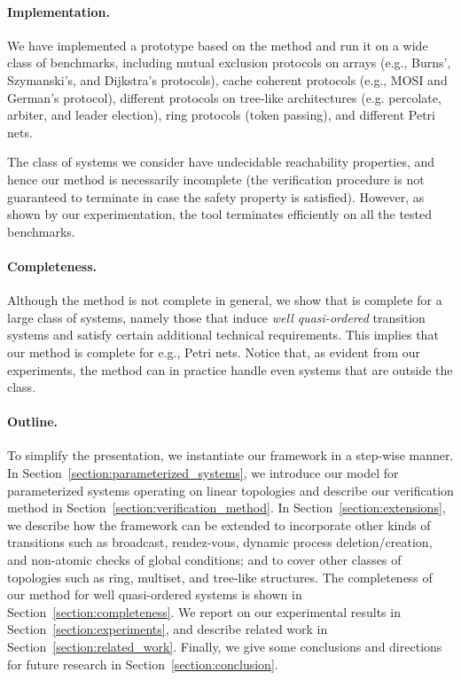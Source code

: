 \paragraph{Implementation.}
%
%
We have implemented a prototype based on the method and run
it on a wide class of benchmarks, including 
mutual exclusion protocols on arrays
 (e.g., Burns', Szymanski's, and Dijkstra's protocols),
cache coherent protocols (e.g., MOSI and German's protocol),
different protocols on tree-like architectures
(e.g. percolate, arbiter, and leader election),
ring protocols (token passing), %
and different Petri nets.
%

The class of systems we consider have undecidable
reachability properties, and hence our method
is necessarily incomplete
(the verification procedure is not guaranteed to terminate in case
the safety property is satisfied).
%
However, as shown by our experimentation, the tool
terminates efficiently on all the tested benchmarks.

\paragraph{Completeness.}
Although the method is not complete in general, we show that is
complete for a large class of systems, namely those
that induce
{\it well quasi-ordered} transition systems \cite{Parosh:Bengt:Karlis:Tsay:general,abdulla:well} and satisfy certain additional technical requirements.
%
This implies that our method is complete for e.g., Petri nets.
%
Notice that, as evident from our experiments, 
the method can in practice handle even systems that are outside the class.


\paragraph{Outline.}
To simplify the presentation, we instantiate our framework in a
step-wise manner.
%
In Section~\ref{section:parameterized_systems}, we introduce our model
for parameterized systems operating on linear topologies and describe
our verification method in Section~\ref{section:verification_method}.
%
In Section~\ref{section:extensions}, we describe how the framework can
be extended to incorporate other kinds of transitions such as
broadcast, rendez-vous, dynamic process deletion/creation, and
non-atomic checks of global conditions; and to cover other classes of
topologies such as ring, multiset, and tree-like structures.
%
The completeness of our method for well quasi-ordered systems is shown
in Section~\ref{section:completeness}.
%
We report on our experimental results in 
Section~\ref{section:experiments}, and 
describe related work in Section~\ref{section:related_work}.
%
Finally, we give some conclusions and directions for future
research in Section~\ref{section:conclusion}.
%
